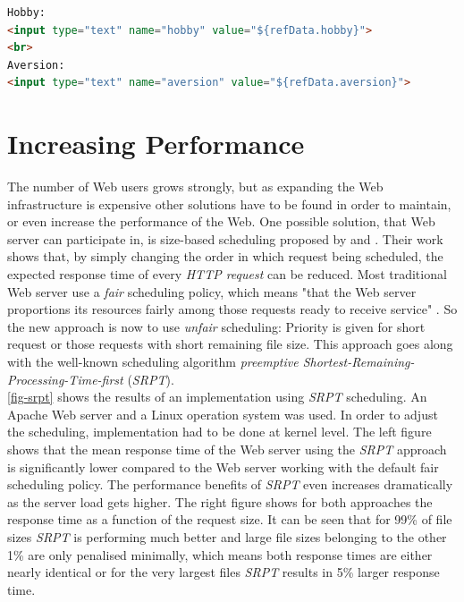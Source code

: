 \documentclass[
  a4paper,               %
  twoside,               %
  headings=small,        %
  DIV=12,                %
  BCOR=1cm,              %
  headinclude=true,      %
  footinclude=true,      %
  numbers=noenddot,      %
  11pt]{scrartcl}        %
\begin{document}
\begin{lstlisting}[language=html, captionpos=b,caption={Java embedded in HTML. Taken from \cite{downey2008web}},label=lst:jsp]
Hobby:
<input type="text" name="hobby" value="${refData.hobby}">
<br>
Aversion:
<input type="text" name="aversion" value="${refData.aversion}">

\end{lstlisting}

\section{Increasing Performance}

The number of Web users grows strongly, but as expanding the Web infrastructure is expensive other solutions have to be found in order to maintain, or even increase the performance of the Web. One possible solution, that Web server can participate in, is size-based scheduling proposed by \cite{schroederSize} and \cite{schorederSchedule}. Their work shows that, by simply changing the order in which request being scheduled, the expected response time of every \textit{HTTP request} can be reduced. Most traditional Web server use a \textit{fair} scheduling policy, which means "that the Web server proportions its resources fairly among those requests ready to receive service" \cite{schroederSize}. So the new approach is now to use \textit{unfair} scheduling: Priority is given for short request or those requests with short remaining file size. This approach goes along with the well-known scheduling algorithm \emph{preemptive Shortest-Remaining-Processing-Time-first} (\emph{SRPT}).\\
\autoref{fig-srpt} shows the results of an implementation using \textit{SRPT} scheduling. An Apache Web server and a Linux operation system was used. In order to adjust the scheduling, implementation had to be done at kernel level. The left figure shows that the mean response time of the Web server using the \textit{SRPT} approach is significantly lower compared to the Web server working with the default fair scheduling policy. The performance benefits of \textit{SRPT} even increases dramatically as the server load gets higher. The right figure shows for both approaches the response time as a function of the request size. It can be seen that for 99\% of file sizes \textit{SRPT} is performing much better and large file sizes belonging to the other 1\% are only penalised minimally, which means both response times are either nearly identical or for the very largest files \textit{SRPT} results in 5\% larger response time.\\
\end{document}
